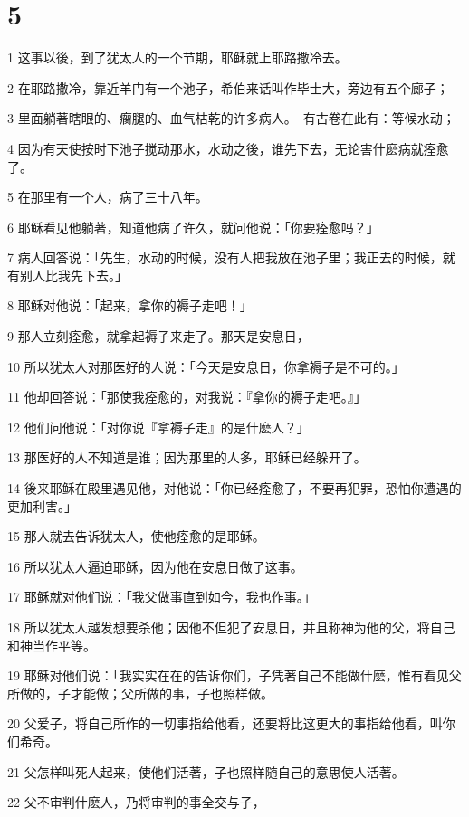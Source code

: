 \chapter{5}

\par 1 这事以後，到了犹太人的一个节期，耶稣就上耶路撒冷去。
\par 2 在耶路撒冷，靠近羊门有一个池子，希伯来话叫作毕士大，旁边有五个廊子；
\par 3 里面躺著瞎眼的、瘸腿的、血气枯乾的许多病人。　有古卷在此有：等候水动；
\par 4 因为有天使按时下池子搅动那水，水动之後，谁先下去，无论害什麽病就痊愈了。
\par 5 在那里有一个人，病了三十八年。
\par 6 耶稣看见他躺著，知道他病了许久，就问他说：「你要痊愈吗？」
\par 7 病人回答说：「先生，水动的时候，没有人把我放在池子里；我正去的时候，就有别人比我先下去。」
\par 8 耶稣对他说：「起来，拿你的褥子走吧！」
\par 9 那人立刻痊愈，就拿起褥子来走了。那天是安息日，
\par 10 所以犹太人对那医好的人说：「今天是安息日，你拿褥子是不可的。」
\par 11 他却回答说：「那使我痊愈的，对我说：『拿你的褥子走吧。』」
\par 12 他们问他说：「对你说『拿褥子走』的是什麽人？」
\par 13 那医好的人不知道是谁；因为那里的人多，耶稣已经躲开了。
\par 14 後来耶稣在殿里遇见他，对他说：「你已经痊愈了，不要再犯罪，恐怕你遭遇的更加利害。」
\par 15 那人就去告诉犹太人，使他痊愈的是耶稣。
\par 16 所以犹太人逼迫耶稣，因为他在安息日做了这事。
\par 17 耶稣就对他们说：「我父做事直到如今，我也作事。」
\par 18 所以犹太人越发想要杀他；因他不但犯了安息日，并且称神为他的父，将自己和神当作平等。
\par 19 耶稣对他们说：「我实实在在的告诉你们，子凭著自己不能做什麽，惟有看见父所做的，子才能做；父所做的事，子也照样做。
\par 20 父爱子，将自己所作的一切事指给他看，还要将比这更大的事指给他看，叫你们希奇。
\par 21 父怎样叫死人起来，使他们活著，子也照样随自己的意思使人活著。
\par 22 父不审判什麽人，乃将审判的事全交与子，
